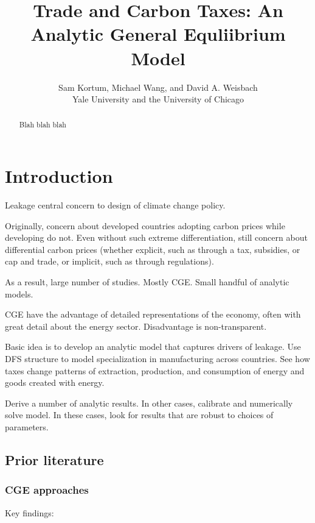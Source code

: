 \documentclass[notitlepage,12pt]{article}
\begin{document}
\title{Trade and Carbon Taxes: An Analytic General Equliibrium Model}
\author{Sam Kortum, Michael Wang, and David A. Weisbach \\
Yale University and the University of Chicago}
\maketitle

\begin{abstract}
Blah blah blah
\end{abstract}

\section{Introduction}

Leakage central concern to design of climate change policy.

Originally, concern about developed countries adopting carbon prices while
developing do not. Even without such extreme differentiation, still concern
about differential carbon prices (whether explicit, such as through a tax,
subsidies, or cap and trade, or implicit, such as through regulations).

As a result, large number of studies. Mostly CGE. Small handful of analytic
models.

CGE have the advantage of detailed representations of the economy, often
with great detail about the energy sector. Disadvantage is non-transparent.

Basic idea is to develop an analytic model that captures drivers of leakage.
Use DFS structure to model specialization in manufacturing across countries.
See how taxes change patterns of extraction, production, and consumption of
energy and goods created with energy.

Derive a number of analytic results. In other cases, calibrate and
numerically solve model. In these cases, look for results that are robust to
choices of parameters.

\subsection{Prior literature}

\subsubsection{CGE approaches}

Key findings:
\end{document}
